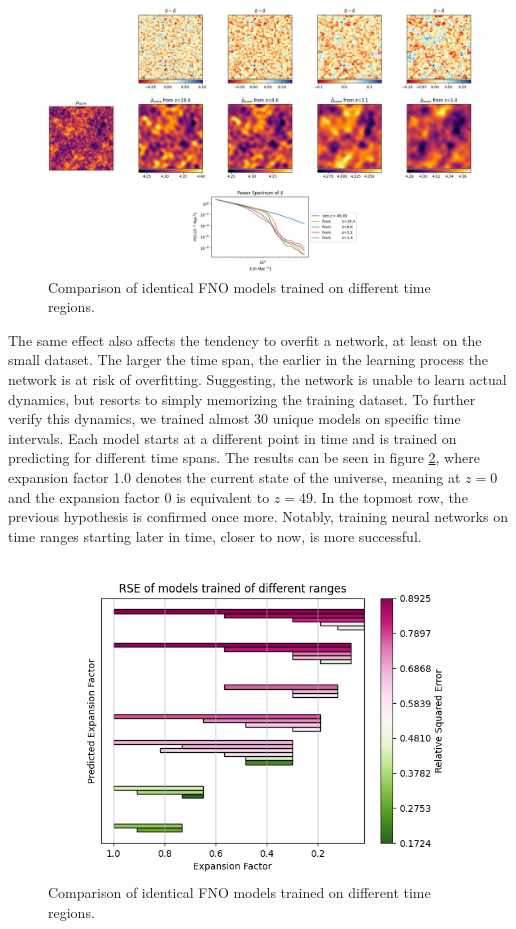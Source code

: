 \documentclass{article}
\begin{document}
\begin{figure}[h]
    \centering
    \includegraphics[width=0.9\linewidth]{img/compare_ic_edit.png}
    \caption{Comparison of identical FNO models trained on different time regions.}
    \label{fig:IC-comp}
\end{figure}

The same effect also affects the tendency to overfit a network, at least on the small dataset. The larger the time span, the earlier in the learning process the network is at risk of overfitting. Suggesting, the network is unable to learn actual dynamics, but resorts to simply memorizing the training dataset. To further verify this dynamics, we trained almost 30 unique models on specific time intervals. Each model starts at a different point in time and is trained on predicting for different time spans. The results can be seen in figure \ref{fig:ranges}, where expansion factor 1.0 denotes the current state of the universe, meaning at $z = 0$ and the expansion factor 0 is equivalent to $z=49$. In the topmost row, the previous hypothesis is confirmed once more. Notably, training neural networks on time ranges starting later in time, closer to now, is more successful.

\begin{figure}[h]
    \centering
    \includegraphics[width=0.7\linewidth]{img/ranges.png}
    \caption{Comparison of identical FNO models trained on different time regions.}
    \label{fig:ranges}
\end{figure}
\end{document}
